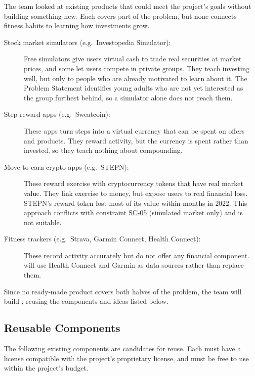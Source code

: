\documentclass[12pt]{article}
\begin{document}
The team looked at existing products that could meet the project's goals
without building something new. Each covers part of the problem, but none
connects fitness habits to learning how investments grow.

\begin{description}
  \item[Stock market simulators (e.g.\ Investopedia Simulator):] Free
  simulators give users virtual cash to trade real securities at market prices,
  and some let users compete in private groups. They teach investing well, but
  only to people who are already motivated to learn about it. The Problem
  Statement identifies young adults who are not yet interested as the group
  furthest behind, so a simulator alone does not reach them.

  \item[Step reward apps (e.g.\ Sweatcoin):] These apps turn steps into a
  virtual currency that can be spent on offers and products. They reward
  activity, but the currency is spent rather than invested, so they teach
  nothing about compounding.

  \item[Move-to-earn crypto apps (e.g.\ STEPN):] These reward exercise with
  cryptocurrency tokens that have real market value. They link exercise to
  money, but expose users to real financial loss. STEPN's reward token lost
  most of its value within months in 2022. This approach conflicts with
  constraint \hyperlink{req:SC-05}{SC-05} (simulated market only) and is not suitable.

  \item[Fitness trackers (e.g.\ Strava, Garmin Connect, Health Connect):]
  These record activity accurately but do not offer any financial component.
  \progname{} will use Health Connect and Garmin as data sources rather than
  replace them.
\end{description}

Since no ready-made product covers both halves of the problem, the team will
build \progname{}, reusing the components and ideas listed below.

\subsection{Reusable Components}

The following existing components are candidates for reuse. Each must have a
license compatible with the project's proprietary license, and must be free to
use within the project's budget.
\end{document}

